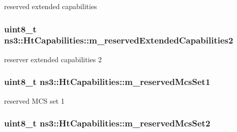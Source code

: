reserved extended capabilities 

\subsubsection[{\texorpdfstring{m\+\_\+reserved\+Extended\+Capabilities2}{m_reservedExtendedCapabilities2}}]{\setlength{\rightskip}{0pt plus 5cm}uint8\+\_\+t ns3\+::\+Ht\+Capabilities\+::m\+\_\+reserved\+Extended\+Capabilities2\hspace{0.3cm}{\ttfamily [private]}}\hypertarget{classns3_1_1HtCapabilities_a04a1a23f406df613792660caf8ef24b7}{}\label{classns3_1_1HtCapabilities_a04a1a23f406df613792660caf8ef24b7}


reserver extended capabilities 2 

\subsubsection[{\texorpdfstring{m\+\_\+reserved\+Mcs\+Set1}{m_reservedMcsSet1}}]{\setlength{\rightskip}{0pt plus 5cm}uint8\+\_\+t ns3\+::\+Ht\+Capabilities\+::m\+\_\+reserved\+Mcs\+Set1\hspace{0.3cm}{\ttfamily [private]}}\hypertarget{classns3_1_1HtCapabilities_af20ecacd0677b12a7cfee6c337ca24f9}{}\label{classns3_1_1HtCapabilities_af20ecacd0677b12a7cfee6c337ca24f9}


reserved M\+CS set 1 

\subsubsection[{\texorpdfstring{m\+\_\+reserved\+Mcs\+Set2}{m_reservedMcsSet2}}]{\setlength{\rightskip}{0pt plus 5cm}uint8\+\_\+t ns3\+::\+Ht\+Capabilities\+::m\+\_\+reserved\+Mcs\+Set2\hspace{0.3cm}{\ttfamily [private]}}\hypertarget{classns3_1_1HtCapabilities_a9bb3ce406ae93ec43eac0204a3bb118e}{}\label{classns3_1_1HtCapabilities_a9bb3ce406ae93ec43eac0204a3bb118e}


